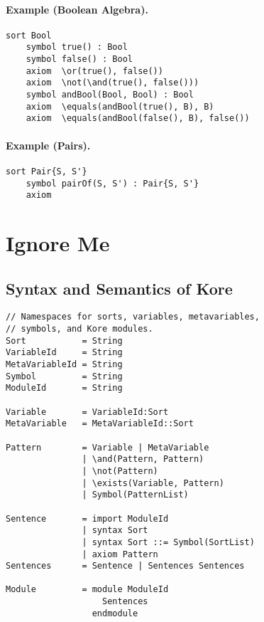 \documentclass[UTF8]{article}
\theoremstyle{plain}
\theoremstyle{definition}
\theoremstyle{remark}
\begin{document}
\paragraph{Example (Boolean Algebra).}
\begin{Verbatim}[fontsize=\small]
    sort Bool
    symbol true() : Bool
    symbol false() : Bool
    axiom  \or(true(), false())
    axiom  \not(\and(true(), false()))
    symbol andBool(Bool, Bool) : Bool
    axiom  \equals(andBool(true(), B), B)
    axiom  \equals(andBool(false(), B), false())
\end{Verbatim}

\paragraph{Example (Pairs).}
\begin{Verbatim}[fontsize=\small]
    sort Pair{S, S'}
    symbol pairOf(S, S') : Pair{S, S'}
    axiom  
\end{Verbatim}

\section{Ignore Me}

\subsection{Syntax and Semantics of Kore}
\label{sec:syntax-of-kore}

\begin{Verbatim}[fontsize=\small]
// Namespaces for sorts, variables, metavariables,
// symbols, and Kore modules.
Sort           = String
VariableId     = String
MetaVariableId = String
Symbol         = String
ModuleId       = String

Variable       = VariableId:Sort
MetaVariable   = MetaVariableId::Sort

Pattern        = Variable | MetaVariable
               | \and(Pattern, Pattern)
               | \not(Pattern)
               | \exists(Variable, Pattern)
               | Symbol(PatternList)

Sentence       = import ModuleId
               | syntax Sort
               | syntax Sort ::= Symbol(SortList)
               | axiom Pattern
Sentences      = Sentence | Sentences Sentences

Module         = module ModuleId
                   Sentences
                 endmodule
\end{Verbatim}
\end{document}
